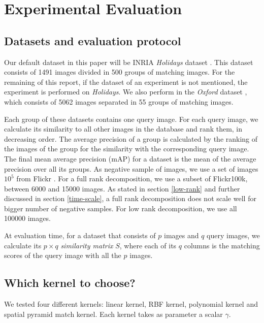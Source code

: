 \section{Experimental Evaluation}
\label{eval}

\subsection{Datasets and evaluation protocol} \label{eval:protocol}
Our default dataset in this paper will be INRIA \emph{Holidays} dataset \cite{holidays}. This dataset consists of 1491 images divided in 500 groups of matching images. For the remaining of this report, if the dataset of an experiment is not mentioned, the experiment is performed on \emph{Holidays}.
We also perform in the \emph{Oxford} dataset \cite{oxford}, which consists of 5062 images separated in 55 groups of matching images.

Each group of these datasets contains one query image. 
For each query image, we calculate its similarity to all other images in the database and rank them, in decreasing order. 
The average precision of a group is calculated by the ranking of the images of the group for the similarity with the corresponding query image. 
The final mean average precision (mAP) for a dataset is the mean of the average precision over all its groups.
As negative sample of images, we use a set of images $10^5$ from Flickr \cite{oxford}. 
For a full rank decomposition, we use a subset of Flickr100k, between $6000$ and 15000 images. 
As stated in section \ref{low-rank} and further discussed in section \ref{time-scale}, a full rank decomposition does not scale well for bigger number of negative samples. For low rank decomposition, we use all 100000 images.

At evaluation time, for a dataset that consists of $p$ images and $q$ query images, we calculate its $p\times q$ \emph{similarity matrix} $S$, where each of its $q$ columns is the matching scores of the query image with all the $p$ images.


\subsection{Which kernel to choose?}
We tested four different kernels: linear kernel, RBF kernel, polynomial kernel and spatial pyramid match kernel. Each kernel takes as parameter a scalar $\gamma$.

